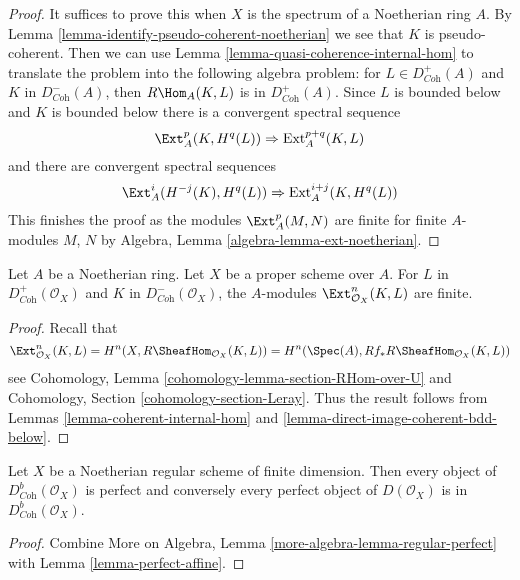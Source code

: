 \begin{proof}
It suffices to prove this when $X$ is the spectrum of
a Noetherian ring $A$.
By Lemma \ref{lemma-identify-pseudo-coherent-noetherian}
we see that $K$ is pseudo-coherent.
Then we can use Lemma \ref{lemma-quasi-coherence-internal-hom}
to translate the problem into the following algebra problem:
for $L \in D^+_{\textit{Coh}}(A)$ and $K$ in $D^-_{\textit{Coh}}(A)$, then
$R\Hom_A(K, L)$ is in $D^+_{\textit{Coh}}(A)$.
Since $L$ is bounded below and $K$ is bounded below there is a
convergent spectral sequence
$$
\Ext^p_A(K, H^q(L)) \Rightarrow \text{Ext}^{p + q}_A(K, L)
$$
and there are convergent spectral sequences
$$
\Ext^i_A(H^{-j}(K), H^q(L)) \Rightarrow \text{Ext}^{i + j}_A(K, H^q(L))
$$
This finishes the proof as the modules $\Ext^p_A(M, N)$
are finite for finite $A$-modules $M$, $N$ by
Algebra, Lemma \ref{algebra-lemma-ext-noetherian}.
\end{proof}

\begin{lemma}
\label{lemma-ext-finite}
Let $A$ be a Noetherian ring. Let $X$ be a proper scheme over $A$.
For $L$ in
$D^+_{\textit{Coh}}(\mathcal{O}_X)$ and $K$ in
$D^-_{\textit{Coh}}(\mathcal{O}_X)$, the $A$-modules
$\Ext_{\mathcal{O}_X}^n(K, L)$ are finite.
\end{lemma}

\begin{proof}
Recall that
$$
\Ext_{\mathcal{O}_X}^n(K, L) =
H^n(X, R\SheafHom_{\mathcal{O}_X}(K, L)) =
H^n(\Spec(A), Rf_*R\SheafHom_{\mathcal{O}_X}(K, L))
$$
see Cohomology, Lemma \ref{cohomology-lemma-section-RHom-over-U}
and Cohomology, Section \ref{cohomology-section-Leray}.
Thus the result follows from
Lemmas \ref{lemma-coherent-internal-hom} and
\ref{lemma-direct-image-coherent-bdd-below}.
\end{proof}

\begin{lemma}
\label{lemma-perfect-on-regular}
Let $X$ be a Noetherian regular scheme of finite dimension. Then
every object of $D^b_{\textit{Coh}}(\mathcal{O}_X)$ is perfect
and conversely every perfect object of $D(\mathcal{O}_X)$
is in $D^b_{\textit{Coh}}(\mathcal{O}_X)$.
\end{lemma}

\begin{proof}
Combine More on Algebra, Lemma \ref{more-algebra-lemma-regular-perfect}
with Lemma \ref{lemma-perfect-affine}.
\end{proof}




